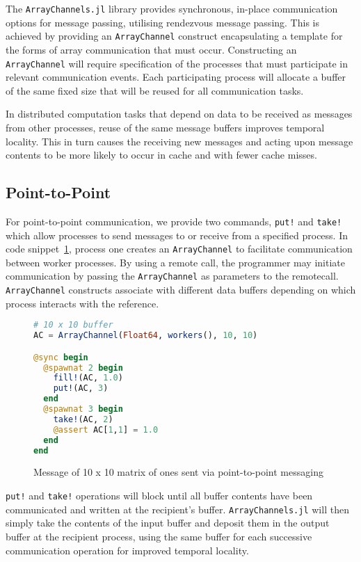 \label{sec:arraychannels}

The \texttt{ArrayChannels.jl} library provides synchronous, in-place
communication options for message passing, utilising rendezvous message
passing. This is achieved by providing an \texttt{ArrayChannel}
construct encapsulating a template for the forms of array communication
that must occur. Constructing an \texttt{ArrayChannel} will require
specification of the processes that must participate in relevant
communication events. Each participating process will allocate a buffer
of the same fixed size that will be reused for all communication tasks.

In distributed computation tasks that depend on data to be received as
messages from other processes, reuse of the same message buffers
improves temporal locality. This in turn causes the receiving new
messages and acting upon message contents to be more likely to occur in
cache and with fewer cache misses.

\subsection{Point-to-Point}
\label{sec:p2p}

For point-to-point communication, we provide two commands, \texttt{put!}
and \texttt{take!} which allow processes to send messages to or receive
from a specified process. In code snippet~\ref{code:put-take}, process
one creates an \texttt{ArrayChannel} to facilitate communication between
worker processes. By using a remote call, the programmer may initiate
communication by passing the \texttt{ArrayChannel} as parameters to the
remotecall. \texttt{ArrayChannel} constructs associate with different
data buffers depending on which process interacts with the reference.

\begin{figure}[htb]
  \begin{lstlisting}[language=Julia]
# 10 x 10 buffer
AC = ArrayChannel(Float64, workers(), 10, 10)

@sync begin
  @spawnat 2 begin
    fill!(AC, 1.0)
    put!(AC, 3)
  end
  @spawnat 3 begin
    take!(AC, 2)
    @assert AC[1,1] = 1.0
  end
end
  \end{lstlisting}
  \caption{Message of 10 x 10 matrix of ones sent via point-to-point messaging}
  \label{code:put-take}
\end{figure}

\texttt{put!} and \texttt{take!} operations will block until all buffer
contents have been communicated and written at the recipient's buffer.
\texttt{ArrayChannels.jl} will then
simply take the contents of the input buffer and deposit them in the
output buffer at the recipient process, using the same buffer for each
successive communication operation for improved temporal locality. 

